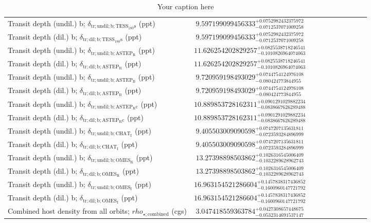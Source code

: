 \begin{table}[h]
\begin{tabular}{|l|c|c|c|c|c|c|c|c|c|}
Transit depth (undil.) b; $\delta_\mathrm{tr; undil; b; TESS_180s}$ (ppt) & \( 9.597199099456333^{+0.0752982432375972}_{-0.0712537071009258} \) & & & & & & & & \\
Transit depth (dil.) b; $\delta_\mathrm{tr; dil; b; TESS_180s}$ (ppt) & \( 9.597199099456333^{+0.0752982432375972}_{-0.0712537071009258} \) & & & & & & & & \\
Transit depth (undil.) b; $\delta_\mathrm{tr; undil; b; ASTEP_R}$ (ppt) & \( 11.626254202829257^{+0.0825538718246541}_{-0.1010826964074063} \) & & & & & & & & \\
Transit depth (dil.) b; $\delta_\mathrm{tr; dil; b; ASTEP_R}$ (ppt) & \( 11.626254202829257^{+0.0825538718246541}_{-0.1010826964074063} \) & & & & & & & & \\
Transit depth (undil.) b; $\delta_\mathrm{tr; undil; b; ASTEP_B}$ (ppt) & \( 9.720959198493029^{+0.0744754124976108}_{-0.080424773844955} \) & & & & & & & & \\
Transit depth (dil.) b; $\delta_\mathrm{tr; dil; b; ASTEP_B}$ (ppt) & \( 9.720959198493029^{+0.0744754124976108}_{-0.080424773844955} \) & & & & & & & & \\
Transit depth (undil.) b; $\delta_\mathrm{tr; undil; b; ASTEP_Rc}$ (ppt) & \( 10.889853728162311^{+0.0901291029882234}_{-0.0838667626289488} \) & & & & & & & & \\
Transit depth (dil.) b; $\delta_\mathrm{tr; dil; b; ASTEP_Rc}$ (ppt) & \( 10.889853728162311^{+0.0901291029882234}_{-0.0838667626289488} \) & & & & & & & & \\
Transit depth (undil.) b; $\delta_\mathrm{tr; undil; b; CHAT_I}$ (ppt) & \( 9.405503009090598^{+0.0747207135631811}_{-0.0723593284896999} \) & & & & & & & & \\
Transit depth (dil.) b; $\delta_\mathrm{tr; dil; b; CHAT_I}$ (ppt) & \( 9.405503009090598^{+0.0747207135631811}_{-0.0723593284896999} \) & & & & & & & & \\
Transit depth (undil.) b; $\delta_\mathrm{tr; undil; b; OMES_R}$ (ppt) & \( 13.27398898503862^{+0.1026316545006409}_{-0.1032289628962743} \) & & & & & & & & \\
Transit depth (dil.) b; $\delta_\mathrm{tr; dil; b; OMES_R}$ (ppt) & \( 13.27398898503862^{+0.1026316545006409}_{-0.1032289628962743} \) & & & & & & & & \\
Transit depth (undil.) b; $\delta_\mathrm{tr; undil; b; OMES_I}$ (ppt) & \( 16.963154521286604^{+0.1457838317436852}_{-0.1600960147721792} \) & & & & & & & & \\
Transit depth (dil.) b; $\delta_\mathrm{tr; dil; b; OMES_I}$ (ppt) & \( 16.963154521286604^{+0.1457838317436852}_{-0.1600960147721792} \) & & & & & & & & \\
Combined host density from all orbits; $rho_\mathrm{\star; combined}$ (cgs) & \( 3.047418559363784^{+0.0427308657448675}_{-0.0532314691537147} \) & & & & & & & & \\
\hline
\end{tabular}
\caption{Your caption here}
\label{tab:your_label}
\end{table}